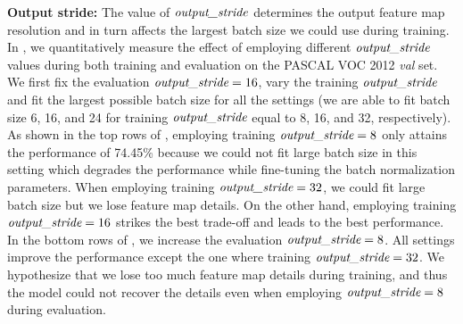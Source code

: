 \textbf{Output stride:} The value of $\emph{output\_stride}$ determines the output feature map resolution and in turn affects the largest batch size we could use during training. In , we quantitatively measure the effect of employing different $\emph{output\_stride}$ values during both training and evaluation on the PASCAL VOC 2012 \textit{val} set. We first fix the evaluation $\emph{output\_stride}=16$, vary the training $\emph{output\_stride}$ and fit the largest possible batch size for all the settings (we are able to fit batch size 6, 16, and 24 for training $\emph{output\_stride}$ equal to 8, 16, and 32, respectively). As shown in the top rows of , employing training $\emph{output\_stride}=8$ only attains the performance of 74.45\% because we could not fit large batch size in this setting which degrades the performance while fine-tuning the batch normalization parameters. When employing training $\emph{output\_stride}=32$, we could fit large batch size but we lose feature map details. On the other hand, employing training $\emph{output\_stride}=16$ strikes the best trade-off and leads to the best performance. In the bottom rows of , we increase the evaluation $\emph{output\_stride}=8$. All settings improve the performance except the one where training $\emph{output\_stride}=32$. We hypothesize that we lose too much feature map details during training, and thus the model could not recover the details even when employing $\emph{output\_stride}=8$ during evaluation.

\begin{table}[!t]
  \centering
  \caption{Effect of hyper-parameters during training on PASCAL VOC 2012 \textit{val} set at $\emph{output\_stride=16}$. {\bf UL}: Upsampling Logits. {\bf BN}: Fine-tuning batch normalization.}
  \label{tab:crop_size}
\end{table}

